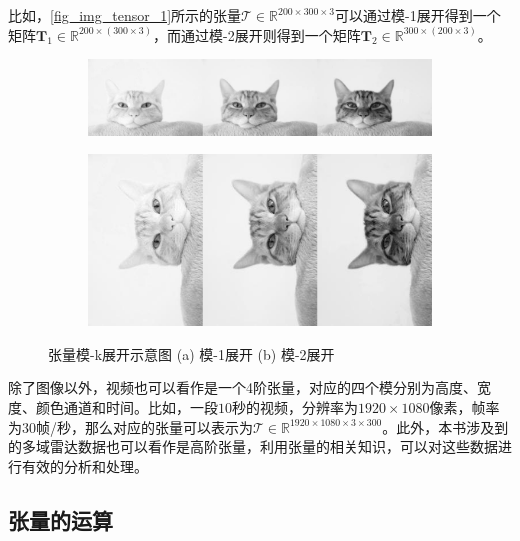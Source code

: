 比如，\cref{fig_img_tensor_1}所示的张量\( \mathcal{T} \in \mathbb{R}^{200 \times 300 \times 3} \)可以通过模-1展开得到一个矩阵$\mathbf{T}_1 \in \mathbb{R}^{200 \times (300 \times 3)}$，而通过模-2展开则得到一个矩阵$\mathbf{T}_2 \in \mathbb{R}^{300 \times (200 \times 3)}$。

\begin{figure}[htb!]
    \centering
    \begin{subfigure}{.45\textwidth}
        \centering
        \includegraphics[width=.9\textwidth]{./img/matrix/cat_m2.jpg}
        \caption{}
        \label{fig_mode_k_1}
    \end{subfigure}
    \begin{subfigure}{.3\textwidth}
        \centering
        \includegraphics[width=.9\textwidth]{./img/matrix/cat_m1.jpg}
        \caption{}
        \label{fig_mode_k_2}
    \end{subfigure}
    \caption{张量模-k展开示意图 (a) 模-1展开 (b) 模-2展开}
    \label{fig_mode_k}
\end{figure}

除了图像以外，视频也可以看作是一个4阶张量，对应的四个模分别为高度、宽度、颜色通道和时间。比如，一段\( 10 \)秒的视频，分辨率为\( 1920 \times 1080 \)像素，帧率为\( 30 \)帧/秒，那么对应的张量可以表示为\( \mathcal{T} \in \mathbb{R}^{1920 \times 1080 \times 3 \times 300} \)。此外，本书涉及到的多域雷达数据也可以看作是高阶张量，利用张量的相关知识，可以对这些数据进行有效的分析和处理。

\subsection{张量的运算}

